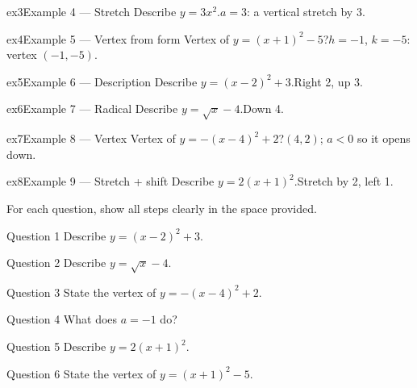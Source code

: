 \documentclass[11pt]{article}
\begin{document}
\begin{example}{ex3}{Example 4 --- Stretch}
Describe $y=3x^2$.\soln $a=3$: a vertical stretch by 3.
\end{example}

\begin{example}{ex4}{Example 5 --- Vertex from form}
Vertex of $y=(x+1)^2-5$?\soln $h=-1$, $k=-5$: vertex $(-1,-5)$.
\end{example}

\begin{example}{ex5}{Example 6 --- Description}
Describe $y=(x-2)^2+3$.\soln Right 2, up 3.
\end{example}

\begin{example}{ex6}{Example 7 --- Radical}
Describe $y=\sqrt{x}-4$.\soln Down 4.
\end{example}

\begin{example}{ex7}{Example 8 --- Vertex}
Vertex of $y=-(x-4)^2+2$?\soln $(4,2)$; $a<0$ so it opens down.
\end{example}

\begin{example}{ex8}{Example 9 --- Stretch + shift}
Describe $y=2(x+1)^2$.\soln Stretch by 2, left 1.
\end{example}

\clearpage
{}
For each question, show all steps clearly in the space provided.

\begin{qbox}{Question 1}
Describe $y=(x-2)^2+3$.\workspace{2.4cm}
\end{qbox}

\begin{qbox}{Question 2}
Describe $y=\sqrt{x}-4$.\workspace{2.4cm}
\end{qbox}

\begin{qbox}{Question 3}
State the vertex of $y=-(x-4)^2+2$.\workspace{2.4cm}
\end{qbox}

\begin{qbox}{Question 4}
What does $a=-1$ do?\workspace{2.4cm}
\end{qbox}

\begin{qbox}{Question 5}
Describe $y=2(x+1)^2$.\workspace{2.4cm}
\end{qbox}

\begin{qbox}{Question 6}
State the vertex of $y=(x+1)^2-5$.\workspace{2.4cm}
\end{qbox}
\end{document}
